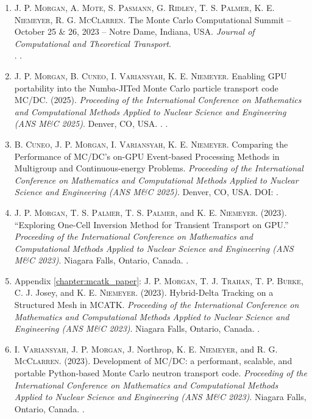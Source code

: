 \begin{enumerate}
    \item \textsc{J. P. Morgan}, \textsc{A. Mote}, \textsc{S. Pasmann}, \textsc{ G. Ridley}, \textsc{T. S. Palmer}, \textsc{K. E. Niemeyer}, \textsc{R. G. McClarren}. The Monte Carlo Computational Summit -- October 25 \& 26, 2023 -- Notre Dame, Indiana, USA. \emph{Journal of Computational and Theoretical Transport}.\\
    .
    . 

    \item \textsc{J. P. Morgan}, \textsc{B. Cuneo}, \textsc{I. Variansyah}, \textsc{K. E. Niemeyer}. Enabling GPU portability into the Numba-JITed Monte Carlo particle transport code MC/DC. (2025). \emph{Proceeding of the International Conference on Mathematics and Computational Methods Applied to Nuclear Science and Engineering (ANS M\&C 2025)}. Denver, CO, USA. . .

    \item \textsc{B. Cuneo}, \textsc{J. P. Morgan}, \textsc{I. Variansyah}, \textsc{K. E. Niemeyer}. Comparing the Performance of MC/DC's on-GPU Event-based Processing Methods in Multigroup and Continuous-energy Problems. \emph{Proceeding of the International Conference on Mathematics and Computational Methods Applied to Nuclear Science and Engineering (ANS M\&C 2025)}. Denver, CO, USA. DOI: .

    \item \textsc{J. P. Morgan}, \textsc{T. S. Palmer}, \textsc{T. S. Palmer}, and \textsc{K. E. Niemeyer}. (2023). “Exploring One-Cell Inversion Method for Transient Transport on GPU.” \emph{Proceeding of the International Conference on Mathematics and Computational Methods Applied to Nuclear Science and Engineering (ANS M\&C 2023)}. Niagara Falls, Ontario, Canada. .

    \item Appendix \ref{chapter:mcatk_paper}: \textsc{J. P. Morgan}, \textsc{T. J. Trahan}, \textsc{T. P. Burke}, {C. J. Josey}, and \textsc{K. E. Niemeyer}. (2023). Hybrid-Delta Tracking on a Structured Mesh in MCATK. \emph{Proceeding of the International Conference on Mathematics and Computational Methods Applied to Nuclear Science and Engineering (ANS M\&C 2023)}. Niagara Falls, Ontario, Canada. .

    \item \textsc{I. Variansyah}, \textsc{J. P. Morgan}, {J. Northrop}, \textsc{K. E. Niemeyer}, and \textsc{R. G. McClarren}. (2023). Development of MC/DC: a performant, scalable, and portable Python-based Monte Carlo neutron transport code. \emph{Proceeding of the International Conference on Mathematics and Computational Methods Applied to Nuclear Science and Engineering (ANS M\&C 2023)}. Niagara Falls, Ontario, Canada. .
    

\end{enumerate}
